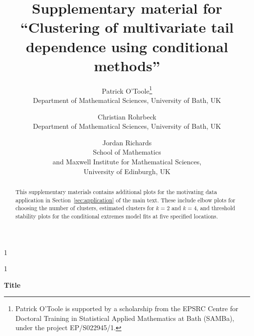 \documentclass[12pt,compact]{article}
\newcommand{\blind}{1}
\begin{document}
\def\spacingset#1{\renewcommand{\baselinestretch}%
{#1}\small\normalsize} \spacingset{1}


\blind
{
  \title{\bf Supplementary material for ``Clustering of multivariate tail dependence using conditional methods''}
  \author{
  Patrick O'Toole\thanks{Patrick O'Toole is supported by a scholarship from the EPSRC Centre for Doctoral Training in Statistical Applied Mathematics at Bath (SAMBa), under the project EP/S022945/1.}\\
  Department of Mathematical Sciences, University of Bath, UK
  \and
  Christian Rohrbeck\\
  Department of Mathematical Sciences, University of Bath, UK 
  \and
  Jordan Richards\\
  School of Mathematics \\
  and Maxwell Institute for Mathematical Sciences, \\
  University of Edinburgh, UK
  }
  \maketitle
} \fi

\blind
{
  \bigskip
  \begin{center}
    {\LARGE\bf Title}
\end{center}
  \medskip
} \fi

\begin{abstract}
  This supplementary materials contains additional plots for the motivating data application in Section~\ref{sec:application} of the main text.
  These include elbow plots for choosing the number of clusters, estimated clusters for $k=2$ and $k=4$, and threshold stability plots for the conditional extremes model fits at five specified locations.
\end{abstract}

\newpage
\spacingset{1.75} %

\setlength{\textfloatsep}{10pt plus 1pt minus 2pt}
\setlength{\intextsep}{8pt plus 1pt minus 2pt}
\setlength{\floatsep}{8pt plus 1pt minus 2pt}

\setlength{\abovedisplayskip}{8pt plus 2pt minus 4pt}
\setlength{\belowdisplayskip}{8pt plus 2pt minus 4pt}
\setlength{\abovedisplayshortskip}{4pt plus 2pt minus 4pt}
\setlength{\belowdisplayshortskip}{4pt plus 2pt minus 4pt}
\end{document}
